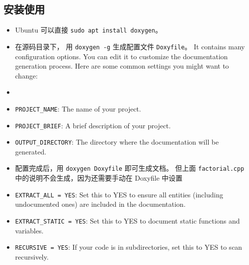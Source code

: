 \subsection{安装使用}
\begin{itemize}
\item Ubuntu 可以直接 \verb`sudo apt install doxygen`。
\item 在源码目录下， 用 \verb`doxygen -g` 生成配置文件 \verb`Doxyfile`。 It contains many configuration options. You can edit it to customize the documentation generation process. Here are some common settings you might want to change:\item 
\item \verb`PROJECT_NAME`: The name of your project.
\item \verb`PROJECT_BRIEF`: A brief description of your project.
\item \verb`OUTPUT_DIRECTORY`: The directory where the documentation will be generated.
\item 配置完成后，用 \verb`doxygen Doxyfile` 即可生成文档。 但上面 \verb`factorial.cpp` 中的说明不会生成，因为还需要手动在 Doxyfile 中设置
\item \verb`EXTRACT_ALL = YES`: Set this to YES to ensure all entities (including undocumented ones) are included in the documentation.
\item \verb`EXTRACT_STATIC = YES`: Set this to YES to document static functions and variables.
\item \verb`RECURSIVE = YES`: If your code is in subdirectories, set this to YES to scan recursively.
\end{itemize}
